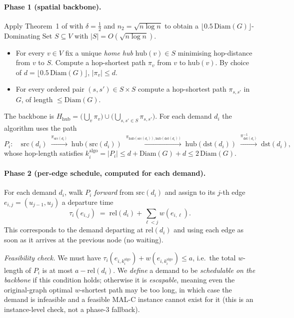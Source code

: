 \documentclass[12pt, a4paper]{article}
\begin{document}
\paragraph{Phase 1 (spatial backbone).}
Apply Theorem~1 of \cite{CDO25} with $\delta=\tfrac12$ and $n_2=\sqrt{n\log n}$ to obtain a $\bigl\lfloor 0.5\,\mathrm{Diam}(G)\bigr\rfloor$-Dominating Set $S\subseteq V$ with $|S|=O(\sqrt{n\log n})$.
\begin{itemize}[noitemsep]
  \item For every $v\in V$ fix a unique \emph{home hub} $\mathrm{hub}(v)\in S$ minimising hop-distance from $v$ to $S$. Compute a hop-shortest path $\pi_v$ from $v$ to $\mathrm{hub}(v)$. By choice of $d=\lfloor 0.5\,\mathrm{Diam}(G)\rfloor$, $|\pi_v|\le d$.
  \item For every ordered pair $(s,s')\in S\times S$ compute a hop-shortest path $\pi_{s,s'}$ in $G$, of length $\le \mathrm{Diam}(G)$.
\end{itemize}
The backbone is $H_\mathrm{hub} = \bigl(\bigcup_v \pi_v\bigr)\cup\bigl(\bigcup_{s,s'\in S}\pi_{s,s'}\bigr)$.
For each demand $d_i$ the algorithm uses the path
\[
P_i:\quad \mathrm{src}(d_i)\;\xrightarrow{\pi_{\mathrm{src}(d_i)}}\;\mathrm{hub}(\mathrm{src}(d_i))\;\xrightarrow{\pi_{\mathrm{hub}(\mathrm{src}(d_i)),\mathrm{hub}(\mathrm{dst}(d_i))}}\;\mathrm{hub}(\mathrm{dst}(d_i))\;\xrightarrow{\pi_{\mathrm{dst}(d_i)}^{-1}}\;\mathrm{dst}(d_i),
\]
whose hop-length satisfies $k_i^{\mathrm{algo}} = |P_i| \le d+\mathrm{Diam}(G)+d \le 2\,\mathrm{Diam}(G)$.

\paragraph{Phase 2 (per-edge schedule, computed for each demand).}
For each demand $d_i$, walk $P_i$ \emph{forward} from $\mathrm{src}(d_i)$ and assign to its $j$-th edge $e_{i,j}=(u_{j-1},u_j)$ a departure time
\[
\tau_i(e_{i,j}) \;=\; \mathrm{rel}(d_i)+\sum_{\ell<j} w(e_{i,\ell}).
\]
This corresponds to the demand departing at $\mathrm{rel}(d_i)$ and using each edge as soon as it arrives at the previous node (no waiting).

\emph{Feasibility check.} We must have $\tau_i(e_{i,k_i^{\mathrm{algo}}})+w(e_{i,k_i^{\mathrm{algo}}})\le a$, i.e.\ the total $w$-length of $P_i$ is at most $a-\mathrm{rel}(d_i)$.
We \emph{define} a demand to be \emph{schedulable on the backbone} if this condition holds; otherwise it is \emph{escapable}, meaning even the original-graph optimal $w$-shortest path may be too long, in which case the demand is infeasible and a feasible MAL-C instance cannot exist for it (this is an instance-level check, not a phase-3 fallback).
\end{document}
